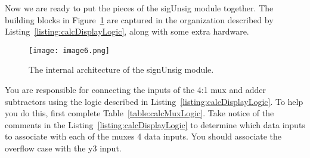 Now we are ready to put the pieces of the sigUnsig module together. The
building blocks in Figure~\ref{fig:calcSigUnSigArch} are captured in the organization described
by Listing~\ref{listing:calcDisplayLogic}, along with some extra hardware.

\begin{figure}[ht]
\texttt{[image:  image6.png]}
\caption{The internal architecture of the signUnsig module.}
\label{fig:calcSigUnSigArch}
\end{figure}

You are responsible for connecting the inputs of the 4:1 mux and adder
subtractors using the logic described in Listing~\ref{listing:calcDisplayLogic}. To help you do this,
first complete Table~\ref{table:calcMuxLogic}. Take notice of the comments in the Listing~\ref{listing:calcDisplayLogic} to
determine which data inputs to associate with each of the muxes 4 data
inputs. You should associate the overflow case with the y3 input.

